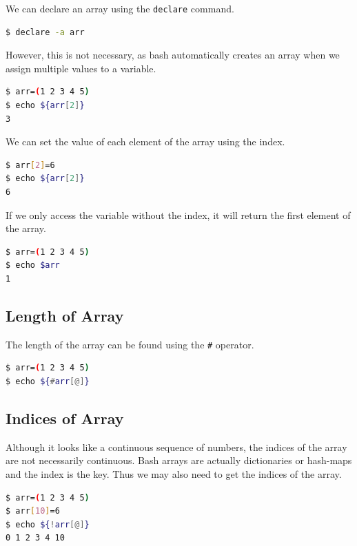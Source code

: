 We can declare an array using the \lstinline{declare} command.

\begin{lstlisting}[language=bash]
$ declare -a arr
\end{lstlisting}

However, this is not necessary, as bash automatically creates an array when we assign multiple values to a variable.

\begin{lstlisting}[language=bash]
$ arr=(1 2 3 4 5)
$ echo ${arr[2]}
3
\end{lstlisting}

We can set the value of each element of the array using the index.

\begin{lstlisting}[language=bash]
$ arr[2]=6
$ echo ${arr[2]}
6
\end{lstlisting}

If we only access the variable without the index, it will return the first element of the array.

\begin{lstlisting}[language=bash]
$ arr=(1 2 3 4 5)
$ echo $arr
1
\end{lstlisting}

\subsection{Length of Array}

The length of the array can be found using the \lstinline{#} operator.

\begin{lstlisting}[language=bash]
$ arr=(1 2 3 4 5)
$ echo ${#arr[@]}
\end{lstlisting}

\subsection{Indices of Array}

Although it looks like a continuous sequence of numbers, the indices of the array are not necessarily continuous. Bash arrays are actually dictionaries or hash-maps
and the index is the key.
Thus we may also need to get the indices of the array.

\begin{lstlisting}[language=bash]
$ arr=(1 2 3 4 5)
$ arr[10]=6
$ echo ${!arr[@]}
0 1 2 3 4 10
\end{lstlisting}

